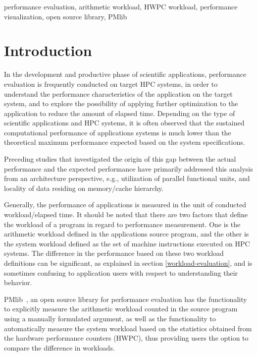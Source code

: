 \documentclass[conference]{IEEEtran}
\begin{document}
\begin{IEEEkeywords}
performance evaluation,
arithmetic workload,
HWPC workload,
performance visualization,
open source library,
PMlib
\end{IEEEkeywords}

\section{Introduction}
In the development and productive phase of scientific applications,
performance evaluation is frequently conducted on target HPC systems,
in order to understand the performance characteristics
of the application on the target system, and to explore the possibility of
applying further optimization to the application to reduce the amount of
elapsed time.
Depending on the type of scientific applications and HPC systems,
it is often observed that
the sustained computational performance of applications
systems is much lower than the theoretical maximum performance
expected based on the system specifications.

Preceding studies that investigated the origin of this gap between the actual
performance and the expected performance have primarily addressed this
analysis from an architecture perspective, e.g., 
utilization of parallel functional units,
and locality of data residing on memory/cache hierarchy.

Generally, the performance of applications is measured in the unit of
conducted workload/elapsed time.
It should be noted that there are two factors that define the workload
of a program in regard to performance measurement. 
One is the arithmetic workload defined in the applications source program,
and the other is the system workload defined as the set of
machine instructions executed on HPC systems.
The difference in the performance based on these two workload definitions
can be significant, as explained in section \ref{workload-evaluation},
and is sometimes confusing to application users with respect to
understanding their behavior.

PMlib~\cite{PMlib:webpage-public}, an open source library for performance
evaluation has the functionality
to explicitly measure the arithmetic workload counted in the source program
using a manually formulated argument, as well as the functionality
to automatically measure the system workload based on the statistics
obtained from the hardware performance counters (HWPC),
thus providing users the option to compare the difference in workloads.
\end{document}
